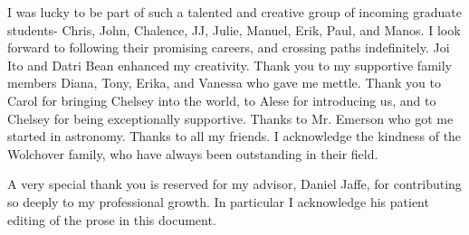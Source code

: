 \documentclass[12pt]{report}	%
\begin{document}
\begin{acknowledgments}
I was lucky to be part of such a talented and creative group of incoming graduate students- Chris, John, Chalence, JJ, Julie, Manuel, Erik, Paul, and Manos.  I look forward to following their promising careers, and crossing paths indefinitely.  Joi Ito and Datri Bean enhanced my creativity.  Thank you to my supportive family members Diana, Tony, Erika, and Vanessa who gave me mettle.  Thank you to Carol for bringing Chelsey into the world, to Alese for introducing us, and to Chelsey for being exceptionally supportive.  Thanks to Mr. Emerson who got me started in astronomy.  Thanks to all my friends.  I acknowledge the kindness of the Wolchover family, who have always been outstanding in their field.

A very special thank you is reserved for my advisor, Daniel Jaffe, for contributing so deeply to my professional growth.  In particular I acknowledge his patient editing of the prose in this document.

\end{acknowledgments}


%
\utabstract
{}%
\indent
\end{document}
